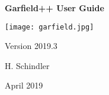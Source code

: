 \begin{titlepage}
  {
  \centering
  \sffamily
  \linespread{1.5}

  \vspace{3cm} 

  \huge{\textbf{Garfield++ User Guide}}

  \vspace{2cm}

  \texttt{[image: garfield.jpg]}

  \vspace{2cm}

  \large
  Version 2019.3 

  \vspace{2cm}
  \large
  H. Schindler

  \vfill

  April 2019

  }
\end{titlepage}
